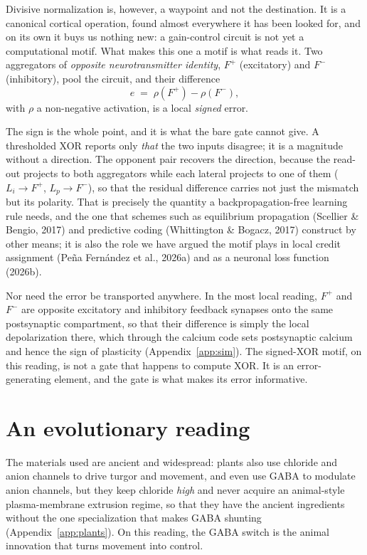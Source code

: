 \documentclass[11pt,a4paper]{article}
\begin{document}
Divisive normalization is, however, a waypoint and not the destination. It is a canonical cortical operation, found almost everywhere it has been looked for, and on its own it buys us nothing new: a gain-control circuit is not yet a computational motif. What makes this one a motif is what reads it. Two aggregators of \emph{opposite neurotransmitter identity}, $F^{+}$ (excitatory) and $F^{-}$ (inhibitory), pool the circuit, and their difference
\begin{equation}
e \;=\; \rho(F^{+}) - \rho(F^{-}),
\end{equation}
with $\rho$ a non-negative activation, is a local \emph{signed} error.

The sign is the whole point, and it is what the bare gate cannot give. A thresholded XOR reports only \emph{that} the two inputs disagree; it is a magnitude without a direction. The opponent pair recovers the direction, because the read-out projects to both aggregators while each lateral projects to one of them ($L_i\!\to\!F^{+}$, $L_p\!\to\!F^{-}$), so that the residual difference carries not just the mismatch but its polarity. That is precisely the quantity a backpropagation-free learning rule needs, and the one that schemes such as equilibrium propagation (Scellier \& Bengio, 2017) and predictive coding (Whittington \& Bogacz, 2017) construct by other means; it is also the role we have argued the motif plays in local credit assignment (Pe\~na Fern\'andez et al., 2026a) and as a neuronal loss function (2026b).

Nor need the error be transported anywhere. In the most local reading, $F^{+}$ and $F^{-}$ are opposite excitatory and inhibitory feedback synapses onto the same postsynaptic compartment, so that their difference is simply the local depolarization there, which through the calcium code sets postsynaptic calcium and hence the sign of plasticity (Appendix~\ref{app:sim}). The signed-XOR motif, on this reading, is not a gate that happens to compute XOR. It is an error-generating element, and the gate is what makes its error informative.

\section{An evolutionary reading}\label{sec:evo}

The materials used are ancient and widespread: plants also use chloride and anion channels to drive turgor and movement, and even use GABA to modulate anion channels, but they keep chloride \emph{high} and never acquire an animal-style plasma-membrane extrusion regime, so that they have the ancient ingredients without the one specialization that makes GABA shunting (Appendix~\ref{app:plants}). On this reading, the GABA switch is the animal innovation that turns movement into control.
\end{document}
